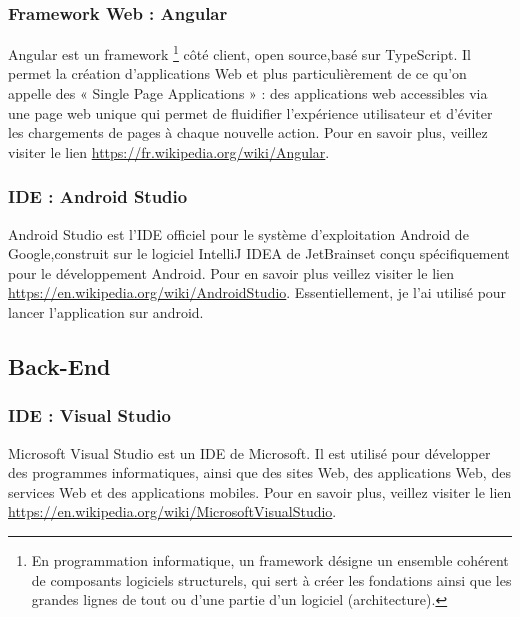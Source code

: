\subsubsection{Framework Web : Angular}
\label{ANGULAR}
Angular est un framework \footnote{En programmation informatique, un framework désigne un ensemble cohérent de composants logiciels structurels, qui sert à créer les fondations ainsi que les grandes lignes de tout ou d’une partie d'un logiciel (architecture).} côté client, open source,basé sur TypeScript.  Il permet la création d’applications Web et plus particulièrement de ce qu’on appelle des  « Single Page Applications » : des applications web accessibles via une page web unique qui permet de fluidifier l’expérience utilisateur et d’éviter les chargements de pages à chaque nouvelle action. Pour en savoir plus, veillez visiter le lien \href{https://fr.wikipedia.org/wiki/Angular}{https://fr.wikipedia.org/wiki/Angular}.

\subsubsection{IDE : Android Studio}
Android Studio est l’\gls{IDE} officiel pour le système d’exploitation Android de Google,construit sur le logiciel IntelliJ IDEA de JetBrainset conçu spécifiquement pour le développement Android. Pour en savoir plus veillez visiter le lien \newline \href{https://en.wikipedia.org/wiki/Android_Studio}{https://en.wikipedia.org/wiki/AndroidStudio}. \newline
Essentiellement, je l'ai utilisé pour lancer l'application sur android.

\subsection{Back-End}
\subsubsection{IDE : Visual Studio}
Microsoft Visual Studio est un \gls{IDE} de Microsoft. Il est utilisé pour développer des programmes informatiques, ainsi que des sites Web, des applications Web, des services Web et des applications mobiles. Pour en savoir plus, veillez visiter le lien \href{https://en.wikipedia.org/wiki/Microsoft_Visual_Studio}{https://en.wikipedia.org/wiki/MicrosoftVisualStudio}.

